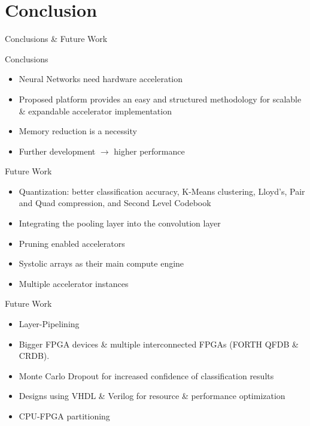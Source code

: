 \setlength{\parskip}{\baselineskip}
\section{Conclusion}

\begin{frame}
	\huge Conclusions \& Future Work
\end{frame}

\begin{frame}{Conclusions}
	\begin{itemize}
		\item Neural Networks need hardware acceleration
		\item Proposed platform provides an easy and structured methodology for scalable \& expandable accelerator implementation
		\item Memory reduction is a necessity
		\item Further development $\rightarrow$ higher performance
	\end{itemize}
\end{frame}

\begin{frame}{Future Work}
	\begin{itemize}
		\item Quantization: better classification accuracy, K-Means clustering, Lloyd's, Pair and Quad compression, and Second Level Codebook
		\item Integrating the pooling layer into the convolution layer
		\item Pruning enabled accelerators
		\item Systolic arrays as their main compute engine
		\item Multiple accelerator instances
	\end{itemize}
\end{frame}

\begin{frame}{Future Work}
	\begin{itemize}
		\item Layer-Pipelining
		\item Bigger FPGA devices \& multiple interconnected FPGAs (FORTH QFDB \& CRDB).
		\item Monte Carlo Dropout for increased confidence of classification results
		\item Designs using VHDL \& Verilog for resource \& performance optimization
		\item CPU-FPGA partitioning
	\end{itemize}
\end{frame}
